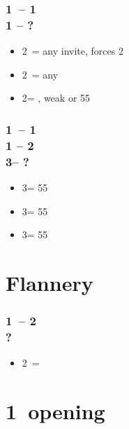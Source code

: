 \subsubsection*{1\ -- 1 \\ 1 -- ?}
\begin{itemize}
    \item 2\clubs\ = any invite, forces 2\diams
    \item 2\diams\ = any \gf
    \item 2\nt = \clubs, weak or 55
\end{itemize}

\subsubsection*{1\ -- 1 \\ 
                1 -- 2\nt\\
                3\clubs -- ?}
\begin{itemize}
    \item 3\diams = 55\diams
    \item 3\hearts = 55\hearts
    \item 3\spades = 55\clubs
\end{itemize}

\section{\texorpdfstring{Flannery}{flannery}}\label{sec:flannery}

\subsubsection*{1\minor\ -- 2\hearts \\ ?}
\begin{itemize}
    \item 2\nt\ = \lsf \vimp
\end{itemize}

\section{\texorpdfstring{1{\color{Maroon}\hspace{-3pt}\color{Blue}}\ opening}{1MOpening_KacperVersion}}\label{sec:1MOpening_KacperVersion}

